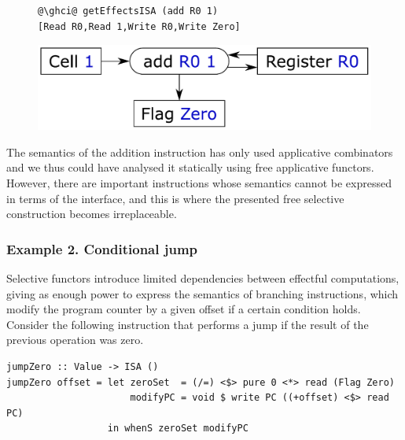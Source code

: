 \vspace{-1mm}
\begin{figure}[!h]
\begin{minipage}{0.53\textwidth}
\raggedleft
\begin{verbatim}
@\ghci@ getEffectsISA (add R0 1)
[Read R0,Read 1,Write R0,Write Zero]
\end{verbatim}
 \end{minipage}
 \begin{minipage}{0.44\textwidth}
  \centering
  \includegraphics[scale=0.3]{fig/add.pdf}
 \end{minipage}
\end{figure}
\vspace{-1mm}

\noindent
The semantics of the addition instruction has only used applicative combinators
and we thus could have analysed it statically using free applicative functors.
However, there are important instructions whose semantics cannot be expressed
in terms of the  interface, and this is where the presented
free selective construction becomes irreplaceable.

\subsubsection{Example 2. Conditional jump}

Selective functors introduce limited dependencies between effectful
computations, giving as enough power to express the semantics of branching
instructions, which modify the program counter by a given offset if a certain
condition holds. Consider the following instruction that performs a jump if the
result of the previous operation was zero.

\vspace{1mm}
\begin{verbatim}
jumpZero :: Value -> ISA ()
jumpZero offset = let zeroSet  = (/=) <$> pure 0 <*> read (Flag Zero)
                      modifyPC = void $ write PC ((+offset) <$> read PC)
                  in whenS zeroSet modifyPC
\end{verbatim}
\vspace{1mm}


